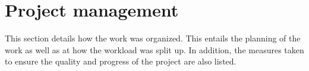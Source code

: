 \section{Project management}
This section details how the work was organized. This entails the planning of the work as well as at how the workload was split up. In addition, the measures taken to ensure the quality and progress of the project are also listed. 








